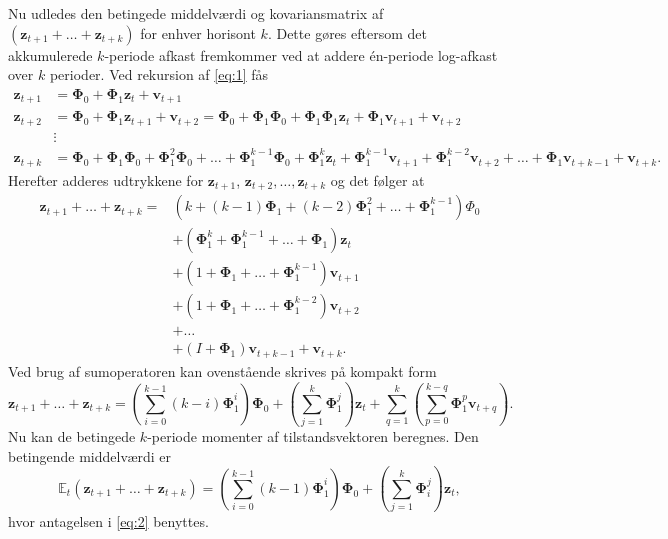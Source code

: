 \documentclass[
  a4paper,
  oneside]{memoir}
\begin{document}
Nu udledes den betingede middelværdi og kovariansmatrix af \((\bm{z}_{t+1}+\dots+\bm{z}_{t+k})\) for enhver horisont \(k\). Dette gøres eftersom det akkumulerede \(k\)-periode afkast fremkommer ved at addere én-periode log-afkast over \(k\) perioder. Ved rekursion af \eqref{eq:1} fås
\begin{align*}
        \bm{z}_{t+1}&=\bm{\Phi}_0+\bm{\Phi}_1 \bm{z}_t+\bm{v}_{t+1}\\
        \bm{z}_{t+2}&=\bm{\Phi}_0+\bm{\Phi}_1 \bm{z}_{t+1}+\bm{v}_{t+2}=\bm{\Phi}_0+\bm{\Phi}_1\bm{\Phi}_0+\bm{\Phi}_1\bm{\Phi}_1 \bm{z}_t +\bm{\Phi}_1 \bm{v}_{t+1}+\bm{v}_{t+2}\\
        &\vdots\\
        \bm{z}_{t+k}&=\bm{\Phi}_0+\bm{\Phi}_1\bm{\Phi}_0+\bm{\Phi}_1^2\bm{\Phi}_0+\dots+\bm{\Phi}_1^{k-1}\bm{\Phi}_0+\bm{\Phi}_1^k \bm{z}_t+\bm{\Phi}_1^{k-1}\bm{v}_{t+1}+\bm{\Phi}_1^{k-2}\bm{v}_{t+2}+\dots+\bm{\Phi}_1 \bm{v}_{t+k-1}+\bm{v}_{t+k}.
    \end{align*}
Herefter adderes udtrykkene for \(\bm{z}_{t+1}\), \(\bm{z}_{t+2},\dots,\bm{z}_{t+k}\) og det følger at
\begin{align*}
        \bm{z}_{t+1}+\dots+\bm{z}_{t+k}=&\left(k+(k-1)\bm{\Phi}_1+(k-2)\bm{\Phi}_1^2+\dots+\bm{\Phi}_1^{k-1}\right)\Phi_0\\
        &+\left(\bm{\Phi}_1^k+\bm{\Phi}_1^{k-1}+\dots+\bm{\Phi}_1\right)\bm{z}_t\\
        &+\left(1+\bm{\Phi}_1+\dots+\bm{\Phi}_1^{k-1}\right)\bm{v}_{t+1}\\
        &+\left(1+\bm{\Phi}_1+\dots+\bm{\Phi}_1^{k-2}\right)\bm{v}_{t+2}\\
        &+\dots\\
        &+(I+\bm{\Phi}_1)\bm{v}_{t+k-1}+\bm{v}_{t+k}.
    \end{align*}
Ved brug af sumoperatoren kan ovenstående skrives på kompakt form
\begin{equation}
        \bm{z}_{t+1}+\dots+\bm{z}_{t+k}=\left(\sum_{i=0}^{k-1} (k-i)\bm{\Phi}_1^i\right)\bm{\Phi}_0+\left(\sum_{j=1}^k \bm{\Phi}_1^j\right)\bm{z}_t+\sum_{q=1}^k\left(\sum_{p=0}^{k-q} \bm{\Phi}_1^p \bm{v}_{t+q}\right).
    \end{equation}
Nu kan de betingede \(k\)-periode momenter af tilstandsvektoren beregnes. Den betingende middelværdi er
\begin{equation}
        \mathbb{E}_t(\bm{z}_{t+1}+\dots+\bm{z}_{t+k})=\left(\sum_{i=0}^{k-1}(k-1)\bm{\Phi}_1^i\right)\bm{\Phi}_0+\left(\sum_{j=1}^k \bm{\Phi}_i^j\right)\bm{z}_t,
    \end{equation}
hvor antagelsen i \eqref{eq:2} benyttes.
\end{document}
